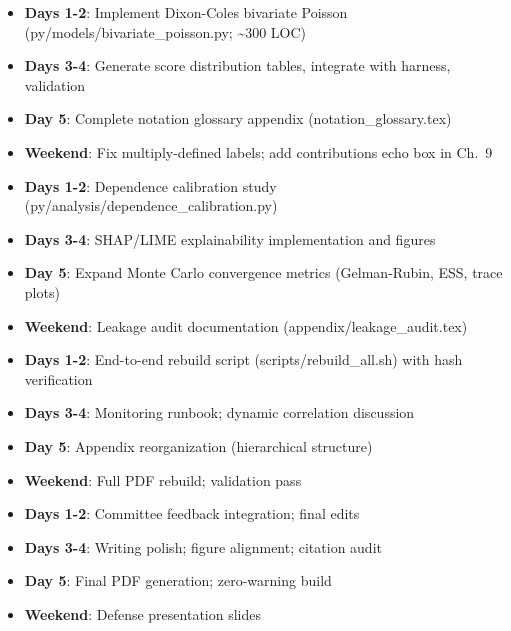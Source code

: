 
\begin{itemize}
  \item \textbf{Days 1-2}: Implement Dixon-Coles bivariate Poisson (py/models/bivariate\_poisson.py; \textasciitilde300 LOC)
  \item \textbf{Days 3-4}: Generate score distribution tables, integrate with harness, validation
  \item \textbf{Day 5}: Complete notation glossary appendix (notation\_glossary.tex)
  \item \textbf{Weekend}: Fix multiply-defined labels; add contributions echo box in Ch.~9
\end{itemize}

\begin{itemize}
  \item \textbf{Days 1-2}: Dependence calibration study (py/analysis/dependence\_calibration.py)
  \item \textbf{Days 3-4}: SHAP/LIME explainability implementation and figures
  \item \textbf{Day 5}: Expand Monte Carlo convergence metrics (Gelman-Rubin, ESS, trace plots)
  \item \textbf{Weekend}: Leakage audit documentation (appendix/leakage\_audit.tex)
\end{itemize}

\begin{itemize}
  \item \textbf{Days 1-2}: End-to-end rebuild script (scripts/rebuild\_all.sh) with hash verification
  \item \textbf{Days 3-4}: Monitoring runbook; dynamic correlation discussion
  \item \textbf{Day 5}: Appendix reorganization (hierarchical structure)
  \item \textbf{Weekend}: Full PDF rebuild; validation pass
\end{itemize}

\begin{itemize}
  \item \textbf{Days 1-2}: Committee feedback integration; final edits
  \item \textbf{Days 3-4}: Writing polish; figure alignment; citation audit
  \item \textbf{Day 5}: Final PDF generation; zero-warning build
  \item \textbf{Weekend}: Defense presentation slides
\end{itemize}

